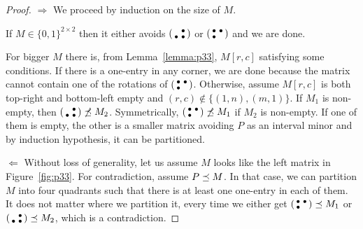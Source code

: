 \begin{proof}
\item[$\Rightarrow$] We proceed by induction on the size of $M$.

If $M\in\{0,1\}^{2\times2}$ then it either avoids $\left(\begin{smallmatrix} &\bullet\\\bullet&\bullet\end{smallmatrix}\right)$ or $\left(\begin{smallmatrix}\bullet&\bullet\\\bullet& \end{smallmatrix}\right)$ and we are done.

For bigger $M$ there is, from Lemma~\ref{lemma:p33}, $M[r,c]$ satisfying some conditions. If there is a one-entry in any corner, we are done because the matrix cannot contain one of the rotations of $\left(\begin{smallmatrix}\bullet&\bullet\\\bullet& \end{smallmatrix}\right)$. Otherwise, assume $M[r,c]$ is both top-right and bottom-left empty and $(r,c)\not\in\{(1,n),(m,1)\}$. If $M_1$ is non-empty, then $\left(\begin{smallmatrix} &\bullet\\\bullet&\bullet\end{smallmatrix}\right)\not\preceq M_2$. Symmetrically, $\left(\begin{smallmatrix}\bullet&\bullet\\\bullet& \end{smallmatrix}\right)\not\preceq M_1$ if $M_2$ is non-empty. If one of them is empty, the other is a smaller matrix avoiding $P$ as an interval minor and by induction hypothesis, it can be partitioned.
\item[$\Leftarrow$] Without loss of generality, let us assume $M$ looks like the left matrix in Figure~\ref{fig:p33}. For contradiction, assume $P\preceq M$. In that case, we can partition $M$ into four quadrants such that there is at least one one-entry in each of them. It does not matter where we partition it, every time we either get $\left(\begin{smallmatrix}\bullet&\bullet\\\bullet& \end{smallmatrix}\right)\preceq M_1$ or $\left(\begin{smallmatrix} &\bullet\\\bullet&\bullet\end{smallmatrix}\right)\preceq M_2$, which is a contradiction.
\end{proof}

